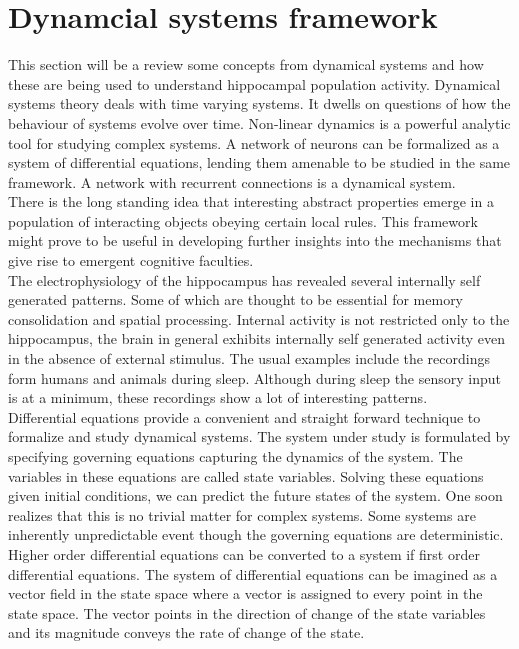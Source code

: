
\section{Dynamcial systems framework}
\label{dynamics}



This section will be a review some concepts from dynamical systems and how these are being used to understand hippocampal population activity. Dynamical systems theory deals with time varying systems. It dwells on questions of how the behaviour of systems evolve over time. Non-linear dynamics is a powerful analytic tool for studying complex systems. A network of neurons can be formalized as a system of differential equations, lending them amenable to be studied in the same framework. A network with recurrent connections is a dynamical system. \\
There is the long standing idea that interesting abstract properties emerge in a population of interacting objects obeying certain local rules. This framework might prove to be useful in developing further insights into the mechanisms that give rise to emergent cognitive faculties.\\
The electrophysiology of the hippocampus has revealed several internally self generated patterns. Some of which are thought to be essential for memory consolidation and spatial processing. Internal activity is not restricted only to the hippocampus, the brain in general exhibits internally self generated activity even in the absence of external stimulus. The usual examples include the recordings form humans and animals during sleep. Although during sleep the sensory input is at a minimum, these recordings show a lot of interesting patterns.\\
Differential equations provide a convenient and straight forward technique to formalize and study dynamical systems. The system under study is formulated by specifying governing equations capturing the dynamics of the system. The variables in these equations are called state variables. Solving these equations given initial conditions, we can predict the future states of the system. One soon realizes that this is no trivial matter for complex systems. Some systems are inherently unpredictable event though the governing equations are deterministic. Higher order differential equations can be converted to a system if first order differential equations. The system of differential equations can be imagined as a vector field in the state space where a vector is assigned to every point in the state space. The vector points in the direction of change of the state variables and its magnitude conveys the rate of change of the state. 
 
